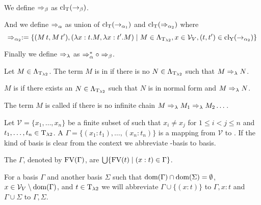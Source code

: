\begin{definition}~

We define $\Rightarrow_\beta$ as $\text{cl\textsubscript{T}}(\rightarrow_\beta)$.

And we define $\Rightarrow_\alpha$ as union of $\text{cl\textsubscript{T}}(\rightarrow_{\alpha_1})$ and $\text{cl\textsubscript{T}}(\Rightarrow_{\alpha_2})$ where \[\Rightarrow_{\alpha_2}:=\{(M\,t,M\,t'),(\lambda x:t.M,\lambda x:t'.M)\mid M\in\Lambda_{\text{T}_{\lambda2}},x\in\mathcal{V}_V,(t,t')\in\text{cl\textsubscript{Y}}(\rightarrow_{\alpha_2})\}\]

Finally we define $\Rightarrow_\lambda$ as $\Rightarrow_\alpha^*\circ\Rightarrow_\beta$.
\end{definition}

\begin{definition}\label{def.2.8}
Let $M\in\Lambda_{\text{T}_{\lambda2}}$. The term $M$ is in  if there is no $N\in\Lambda_{\text{T}_{\lambda2}}$ such that $M\Rightarrow_\lambda N$.

$M$ is  if there exists an $N\in\Lambda_{\text{T}_{\lambda2}}$ such that $N$ is in normal form and $M\Rightarrow_\lambda N$.

The term $M$ is called  if there is no infinite chain $M\Rightarrow_\lambda M_1\Rightarrow_\lambda M_2\dots$.
\end{definition}

\begin{definition}\label{def.2.9} Let $\mathcal{V}=\{x_1,\dots,x_n\}$ be a finite subset of \lambdaValVar{} such that $x_i\neq x_j$ for $1\leq i<j\leq n$ and $t_1,\dots,t_n\in\text{T}_{\lambda2}$.	A  $\Gamma=\{(x_1:t_1),\dots,(x_n:t_n)\}$ is a mapping from $\mathcal{V}$ to \lambdaTypes{}. If the kind of basis is clear from the context we abbreviate \lambdaTwo-basis to basis. 

The  $\Gamma$, denoted by $\text{FV}(\Gamma)$, are $\bigcup\{\text{FV}(t)\mid(x:t)\in\Gamma\}$.
\end{definition}

For a basis $\Gamma$ and another basis $\Sigma$ such that $\text{dom}(\Gamma)\cap\text{dom}(\Sigma)=\emptyset$, $x\in\mathcal{V}_V\setminus\text{dom}(\Gamma)$, and $t\in\text{T}_{\lambda2}$ we will abbreviate $\Gamma\cup\{(x:t)\}$ to $\Gamma,x:t$ and $\Gamma\cup\Sigma$ to $\Gamma,\Sigma$. %

